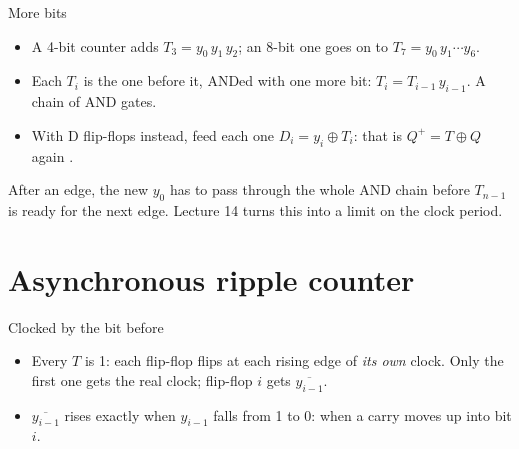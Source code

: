 \documentclass[10pt]{wosm-slides}
\newcommand*\junction[1]{\fill[wosm-text] #1 circle (1.5pt);}
\begin{document}
\begin{frame}{More bits}
  \begin{itemize}
    \item A 4-bit counter adds $T_3 = y_0\, y_1\, y_2$; an 8-bit one goes on to
      $T_7 = y_0\, y_1 \cdots y_6$.
    \item Each $T_i$ is the one before it, ANDed with one more bit:
      $T_{i} = T_{i-1}\, y_{i-1}$. A chain of AND gates.
    \item With D flip-flops instead, feed each one $D_i = y_i \oplus T_i$: that is
      $Q^{+} = T \oplus Q$ again .
  \end{itemize}

  \begin{remark}
    After an edge, the new $y_0$ has to pass through the whole AND chain before
    $T_{n-1}$ is ready for the next edge. Lecture 14 turns this into a limit on the
    clock period.
  \end{remark}
\end{frame}

\section{Asynchronous ripple counter}

\begin{frame}{Clocked by the bit before}
  \begin{center}
  \end{center}

  \begin{itemize}
    \item Every $T$ is 1: each flip-flop flips at each rising edge of \emph{its own}
      clock. Only the first one gets the real clock; flip-flop $i$ gets
      $\overline{y_{i-1}}$.
    \item $\overline{y_{i-1}}$ rises exactly when $y_{i-1}$ falls from 1 to 0: when
      a carry moves up into bit $i$.
  \end{itemize}
\end{frame}
\end{document}
